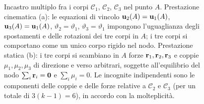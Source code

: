\begin{figure}[htbp]
	\caption[Incastro multiplo fra tre corpi]{%
		Incastro multiplo fra i corpi $\mathcal{C}_1$, $\mathcal{C}_2$,
		$\mathcal{C}_3$ nel punto $A$. Prestazione cinematica (a):
		le equazioni di vincolo $\mathbf{u}_2(A) = \mathbf{u}_1(A)$,
		$\mathbf{u}_3(A) = \mathbf{u}_1(A)$, $\vartheta_2 = \vartheta_1$,
		$\vartheta_3 = \vartheta_1$ impongono l'uguaglianza degli
		spostamenti e delle rotazioni dei tre corpi in $A$; i tre
		corpi si comportano come un unico corpo rigido nel nodo.
		Prestazione statica (b): i tre corpi si scambiano in $A$
		forze $\mathbf{r}_1, \mathbf{r}_2, \mathbf{r}_3$ e coppie $\mu_1, \mu_2, \mu_3$
		di direzione e verso arbitrari, soggette all'equilibrio
		del nodo $\sum_i \mathbf{r}_i = \mathbf{0}$ e $\sum_i \mu_i = 0$.
		Le incognite indipendenti sono le componenti delle
		coppie e delle forze relative a $\mathcal{C}_2$ e
		$\mathcal{C}_3$ (per un totale di $3(k-1) = 6$), in
		accordo con la molteplicità.}
	\label{fig:incastro_triplo}
\end{figure}
